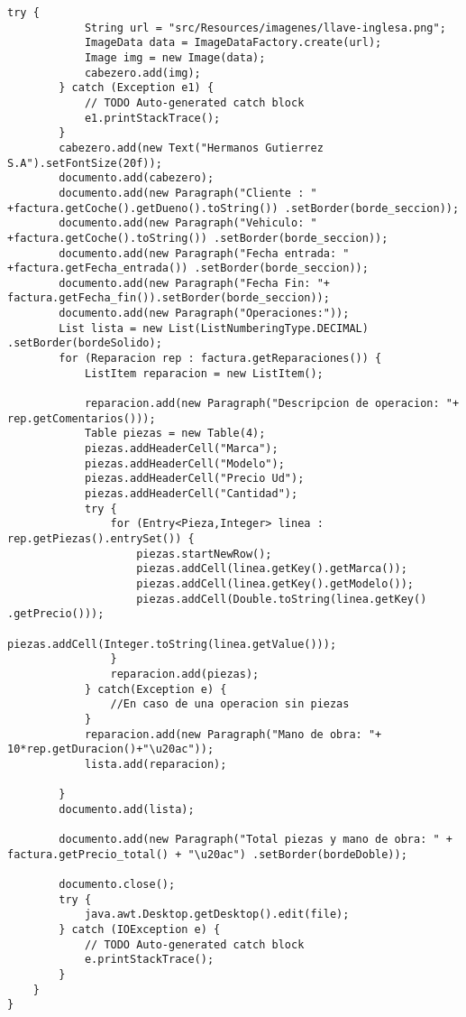\begin{lstlisting}[caption=CreadorPDF.java (App Escritorio)]
		try {
			String url = "src/Resources/imagenes/llave-inglesa.png";
			ImageData data = ImageDataFactory.create(url);
			Image img = new Image(data);
			cabezero.add(img);
		} catch (Exception e1) {
			// TODO Auto-generated catch block
			e1.printStackTrace();
		}
		cabezero.add(new Text("Hermanos Gutierrez S.A").setFontSize(20f));
    	documento.add(cabezero);
    	documento.add(new Paragraph("Cliente : " +factura.getCoche().getDueno().toString()) .setBorder(borde_seccion));
    	documento.add(new Paragraph("Vehiculo: " +factura.getCoche().toString()) .setBorder(borde_seccion));
    	documento.add(new Paragraph("Fecha entrada: " +factura.getFecha_entrada()) .setBorder(borde_seccion));
    	documento.add(new Paragraph("Fecha Fin: "+ factura.getFecha_fin()).setBorder(borde_seccion));
    	documento.add(new Paragraph("Operaciones:"));
    	List lista = new List(ListNumberingType.DECIMAL) .setBorder(bordeSolido);
    	for (Reparacion rep : factura.getReparaciones()) {
			ListItem reparacion = new ListItem();
			
    		reparacion.add(new Paragraph("Descripcion de operacion: "+ rep.getComentarios()));
    		Table piezas = new Table(4);
    		piezas.addHeaderCell("Marca");
        	piezas.addHeaderCell("Modelo");
        	piezas.addHeaderCell("Precio Ud");
        	piezas.addHeaderCell("Cantidad");
        	try {
        		for (Entry<Pieza,Integer> linea : rep.getPiezas().entrySet()) {
        			piezas.startNewRow();
        			piezas.addCell(linea.getKey().getMarca());
        			piezas.addCell(linea.getKey().getModelo());
        			piezas.addCell(Double.toString(linea.getKey() .getPrecio()));
        			piezas.addCell(Integer.toString(linea.getValue()));
        		}
        		reparacion.add(piezas);
        	} catch(Exception e) {
        		//En caso de una operacion sin piezas
        	}
			reparacion.add(new Paragraph("Mano de obra: "+ 10*rep.getDuracion()+"\u20ac"));
			lista.add(reparacion);

    	} 
		documento.add(lista);
    	
    	documento.add(new Paragraph("Total piezas y mano de obra: " + factura.getPrecio_total() + "\u20ac") .setBorder(bordeDoble));
    	
    	documento.close();
    	try {
			java.awt.Desktop.getDesktop().edit(file);
		} catch (IOException e) {
			// TODO Auto-generated catch block
			e.printStackTrace();
		}
    }
}
\end{lstlisting}
\clearpage